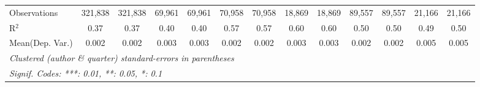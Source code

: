 \begin{tabular}{lcccccccccccc}
   Observations                             & 321,838       & 321,838        & 69,961       & 69,961        & 70,958  & 70,958   & 18,869  & 18,869   & 89,557        & 89,557        & 21,166       & 21,166\\  
   R$^2$                                    & 0.37          & 0.37           & 0.40         & 0.40          & 0.57    & 0.57     & 0.60    & 0.60     & 0.50          & 0.50          & 0.49         & 0.50\\  
Mean(Dep. Var.) & 0.002 & 0.002 & 0.003 & 0.003 & 0.002 & 0.002 & 0.003 & 0.003 & 0.002 & 0.002 & 0.005 & 0.005 \\
   \midrule \midrule
   \multicolumn{13}{l}{\emph{Clustered (author \& quarter) standard-errors in parentheses}}\\
   \multicolumn{13}{l}{\emph{Signif. Codes: ***: 0.01, **: 0.05, *: 0.1}}\\
\end{tabular}
\par\endgroup
